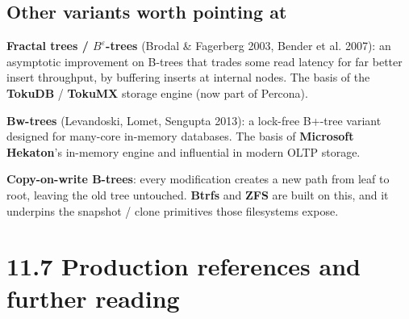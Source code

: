 \documentclass[11pt]{article}
\begin{document}
\subsection*{Other variants worth pointing at}

\begin{notebox}
\textbf{Fractal trees / $B^\varepsilon$-trees} (Brodal \& Fagerberg
2003, Bender et al. 2007): an asymptotic improvement on B-trees that
trades some read latency for far better insert throughput, by
buffering inserts at internal nodes. The basis of the
\textbf{TokuDB} / \textbf{TokuMX} storage engine (now part of
Percona).

\textbf{Bw-trees} (Levandoski, Lomet, Sengupta 2013): a lock-free
B+-tree variant designed for many-core in-memory databases. The
basis of \textbf{Microsoft Hekaton}'s in-memory engine and influential
in modern OLTP storage.

\textbf{Copy-on-write B-trees}: every modification creates a new
path from leaf to root, leaving the old tree untouched.
\textbf{Btrfs} and \textbf{ZFS} are built on this, and it
underpins the snapshot / clone primitives those filesystems
expose.
\end{notebox}

\section{11.7 Production references and further reading}
\end{document}

